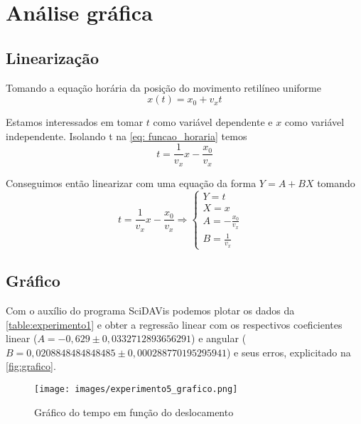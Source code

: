 \chapter{Análise gráfica}\label{cap:analise_grafica}
\section{Linearização}
Tomando a equação horária da posição do movimento retilíneo uniforme
\begin{equation}\label{eq: funcao_horaria}
    x(t) = x_0 + v_x t
\end{equation}

Estamos interessados em tomar $t$ como variável dependente e $x$ como variável independente. Isolando t na \autoref{eq: funcao_horaria} temos
\begin{equation*}
    t = \frac{1}{v_x}x - \frac{x_0}{v_x}
\end{equation*}

Conseguimos então linearizar com uma equação da forma $Y = A + BX$ tomando
\begin{equation}\label{eq: linearizacao}
    t = \frac{1}{v_x}x - \frac{x_0}{v_x} \Rightarrow \left\{ \begin{array}{ll}
        Y = t &  \\
        X = x &  \\
        A = -\frac{x_0}{v_x} & \\
        B = \frac{1}{v_x}
    \end{array}\right.
\end{equation}

\section{Gráfico}
Com o auxílio do programa SciDAVis podemos plotar os dados da \autoref{table:experimento1} e obter a regressão linear com os respectivos coeficientes linear ($A = -0,629 \pm 0,0332712893656291$) e angular ($B =  0,0208848484848485 \pm 0,000288770195295941$) e seus erros, explicitado na \autoref{fig:grafico}.
\begin{figure}[htb]
	\caption{\label{fig:grafico}Gráfico do tempo em função do deslocamento}
	\begin{center}
		\texttt{[image: images/experimento5\_grafico.png]}
	\end{center}
\end{figure}
